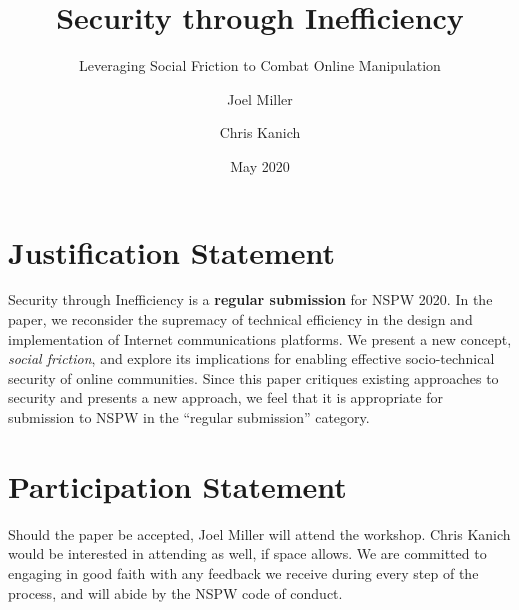 \documentclass[sigconf]{acmart}
\title{Security through Inefficiency}
\subtitle{Leveraging Social Friction to Combat Online Manipulation}
\author{Joel Miller}
\affiliation{%
  \institution{University of Illinois at Chicago}
}
\author{Chris Kanich}
\affiliation{%
  \institution{University of Illinois at Chicago}
}
\date{May 2020}
\begin{document}
\maketitle

\section{Justification Statement}


Security through Inefficiency is a \textbf{regular submission} for NSPW 2020. In the paper, we reconsider the supremacy of technical efficiency in the design and implementation of Internet communications platforms. We present a new concept, \textit{social friction}, and explore its implications for enabling effective socio-technical security of online communities. Since this paper critiques existing approaches to security and presents a new approach, we feel that it is  appropriate for submission to NSPW in the ``regular submission'' category.

\section{Participation Statement}

Should the paper be accepted, Joel Miller will attend the workshop. Chris Kanich would be interested in attending as well, if space allows. We are committed to engaging in good faith with any feedback we receive during every step of the process, and will abide by the NSPW code of conduct.

\thispagestyle{empty}
\end{document}

